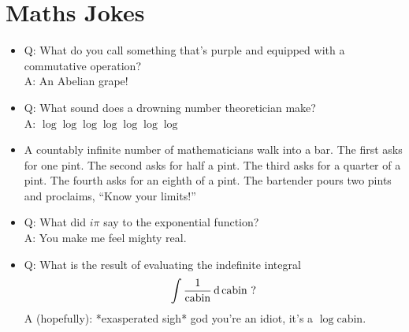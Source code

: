 \section{Maths Jokes}

\begin{itemize}
 \item
  Q: What do you call something that's purple and equipped with a commutative
  operation? \\
  A: An Abelian grape!
 \item
  Q: What sound does a drowning number theoretician make? \\
  A: \(\log \log \log \log \log \log \log\)
 \item
  A countably infinite number of mathematicians walk into a bar.
  {The first asks for one pint.
  \footnotesize The second asks for half a pint.
  \scriptsize The third asks for a quarter of a pint.
  \tiny The fourth asks for an eighth of a pint.}
  The bartender pours two pints and proclaims, ``Know your limits!''
 \item
  Q: What did \(i \pi\) say to the exponential function? \\
  A: You make me feel mighty real.
 \item
  Q: What is the result of evaluating the indefinite integral
  \begin{equation*}
   \integ{\frac 1{\mathrm{cabin}}}{\,\mathrm{cabin}} \ \text?
  \end{equation*}
  A (hopefully): *exasperated sigh* god you're an idiot, it's a
  \(\log \mathrm{cabin}\).


\end{itemize}
